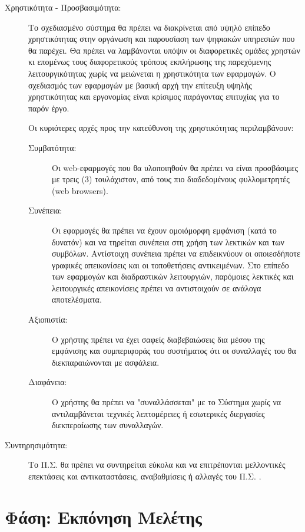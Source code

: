\documentclass{assignment}
\begin{document}
\begin{description}
\item[Χρηστικότητα - Προσβασιμότητα:] Το σχεδιασμένο σύστημα θα πρέπει να διακρίνεται από υψηλό επίπεδο χρηστικότητας στην οργάνωση και παρουσίαση των ψηφιακών υπηρεσιών που θα παρέχει. Θα πρέπει να λαμβάνονται υπόψιν οι διαφορετικές ομάδες χρηστών κι επομένως τους διαφορετικούς τρόπους εκπλήρωσης της παρεχόμενης λειτουργικότητας χωρίς να μειώνεται η χρηστικότητα των εφαρμογών. Ο σχεδιασμός των εφαρμογών με βασική αρχή την επίτευξη υψηλής χρηστικότητας και εργονομίας είναι κρίσιμος παράγοντας επιτυχίας για το παρόν έργο.

Οι κυριότερες αρχές προς την κατεύθυνση της χρηστικότητας περιλαμβάνουν:
\begin{description}
	\item[Συμβατότητα:] Οι web-εφαρμογές που θα υλοποιηθούν θα πρέπει να είναι προσβάσιμες με τρεις (3) τουλάχιστον, από τους πιο διαδεδομένους
φυλλομετρητές (web browsers).

	\item[Συνέπεια:] Οι εφαρμογές θα πρέπει να έχουν ομοιόμορφη εμφάνιση (κατά το δυνατόν) και να τηρείται συνέπεια στη χρήση των λεκτικών και των συμβόλων. Αντίστοιχη συνέπεια πρέπει να επιδεικνύουν οι οποιεσδήποτε γραφικές απεικονίσεις και οι τοποθετήσεις αντικειμένων. Στο επίπεδο των εφαρμογών και διαδραστικών λειτουργιών, παρόμοιες λεκτικές και λειτουργικές απεικονίσεις πρέπει να αντιστοιχούν σε ανάλογα αποτελέσματα.

	\item [Αξιοπιστία:] Ο χρήστης πρέπει να έχει σαφείς διαβεβαιώσεις δια μέσου της εμφάνισης και συμπεριφοράς του συστήματος ότι οι συναλλαγές του θα διεκπαραιώνονται με ασφάλεια.

	\item[Διαφάνεια:] Ο χρήστης θα πρέπει να "συναλλάσσεται" με το Σύστημα χωρίς να αντιλαμβάνεται τεχνικές λεπτομέρειες ή εσωτερικές διεργασίες διεκπεραίωσης των συναλλαγών.
\end{description}

\item[Συντηρησιμότητα:] Το Π.Σ. θα πρέπει να συντηρείται εύκολα και να επιτρέπονται μελλοντικές επεκτάσεις και αντικαταστάσεις, αναβαθμίσεις ή αλλαγές του Π.Σ. .

\end{description}


\section{Φάση: Εκπόνηση Μελέτης}
\label{section: Elaboration}
\end{document}
